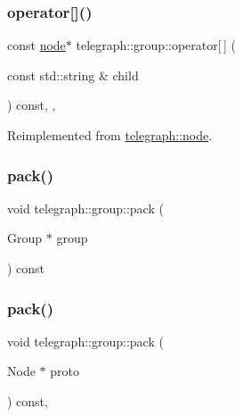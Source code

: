 \subsubsection{\texorpdfstring{operator[]()}{operator[]()}\hspace{0.1cm}{\footnotesize\ttfamily [4/4]}}
{\footnotesize\ttfamily const \hyperlink{classtelegraph_1_1node}{node}$\ast$ telegraph\+::group\+::operator\mbox{[}$\,$\mbox{]} (\begin{DoxyParamCaption}\item[{const std\+::string \&}]{child }\end{DoxyParamCaption}) const\hspace{0.3cm}{\ttfamily [inline]}, {\ttfamily [override]}, {\ttfamily [virtual]}}



Reimplemented from \hyperlink{classtelegraph_1_1node_aad6b0bbccc9831f82117a1cc03493f6c}{telegraph\+::node}.

\mbox{\label{classtelegraph_1_1group_a2899f0bebaa9696675c7a32fd92d54e9}} 
\subsubsection{\texorpdfstring{pack()}{pack()}\hspace{0.1cm}{\footnotesize\ttfamily [1/2]}}
{\footnotesize\ttfamily void telegraph\+::group\+::pack (\begin{DoxyParamCaption}\item[{Group $\ast$}]{group }\end{DoxyParamCaption}) const}

\mbox{\label{classtelegraph_1_1group_a070decfe980bb669646af5307f5c93e4}} 
\subsubsection{\texorpdfstring{pack()}{pack()}\hspace{0.1cm}{\footnotesize\ttfamily [2/2]}}
{\footnotesize\ttfamily void telegraph\+::group\+::pack (\begin{DoxyParamCaption}\item[{Node $\ast$}]{proto }\end{DoxyParamCaption}) const\hspace{0.3cm}{\ttfamily [override]}, {\ttfamily [virtual]}}



